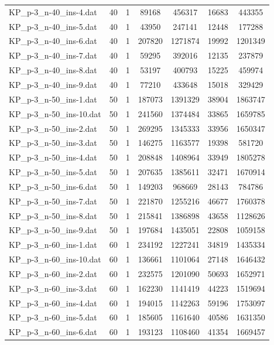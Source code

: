 \begin{table}[!ht]
\begin{tabular}{lcccccc}
KP\_p-3\_n-40\_ins-4.dat & 40 & 1 & 89168 & 456317 & 16683 & 443355 \\
KP\_p-3\_n-40\_ins-5.dat & 40 & 1 & 43950 & 247141 & 12448 & 177288 \\
KP\_p-3\_n-40\_ins-6.dat & 40 & 1 & 207820 & 1271874 & 19992 & 1201349 \\
KP\_p-3\_n-40\_ins-7.dat & 40 & 1 & 59295 & 392016 & 12135 & 237879 \\
KP\_p-3\_n-40\_ins-8.dat & 40 & 1 & 53197 & 400793 & 15225 & 459974 \\
KP\_p-3\_n-40\_ins-9.dat & 40 & 1 & 77210 & 433648 & 15018 & 329429 \\
KP\_p-3\_n-50\_ins-1.dat & 50 & 1 & 187073 & 1391329 & 38904 & 1863747 \\
KP\_p-3\_n-50\_ins-10.dat & 50 & 1 & 241560 & 1374484 & 33865 & 1659785 \\
KP\_p-3\_n-50\_ins-2.dat & 50 & 1 & 269295 & 1345333 & 33956 & 1650347 \\
KP\_p-3\_n-50\_ins-3.dat & 50 & 1 & 146275 & 1163577 & 19398 & 581720 \\
KP\_p-3\_n-50\_ins-4.dat & 50 & 1 & 208848 & 1408964 & 33949 & 1805278 \\
KP\_p-3\_n-50\_ins-5.dat & 50 & 1 & 207635 & 1385611 & 32471 & 1670914 \\
KP\_p-3\_n-50\_ins-6.dat & 50 & 1 & 149203 & 968669 & 28143 & 784786 \\
KP\_p-3\_n-50\_ins-7.dat & 50 & 1 & 221870 & 1255216 & 46677 & 1760378 \\
KP\_p-3\_n-50\_ins-8.dat & 50 & 1 & 215841 & 1386898 & 43658 & 1128626 \\
KP\_p-3\_n-50\_ins-9.dat & 50 & 1 & 197684 & 1435051 & 22808 & 1059158 \\
KP\_p-3\_n-60\_ins-1.dat & 60 & 1 & 234192 & 1227241 & 34819 & 1435334 \\
KP\_p-3\_n-60\_ins-10.dat & 60 & 1 & 136661 & 1101064 & 27148 & 1646432 \\
KP\_p-3\_n-60\_ins-2.dat & 60 & 1 & 232575 & 1201090 & 50693 & 1652971 \\
KP\_p-3\_n-60\_ins-3.dat & 60 & 1 & 162230 & 1141419 & 44223 & 1519694 \\
KP\_p-3\_n-60\_ins-4.dat & 60 & 1 & 194015 & 1142263 & 59196 & 1753097 \\
KP\_p-3\_n-60\_ins-5.dat & 60 & 1 & 185605 & 1161640 & 40586 & 1631350 \\
KP\_p-3\_n-60\_ins-6.dat & 60 & 1 & 193123 & 1108460 & 41354 & 1669457 \\

\end{tabular}
\end{table}
